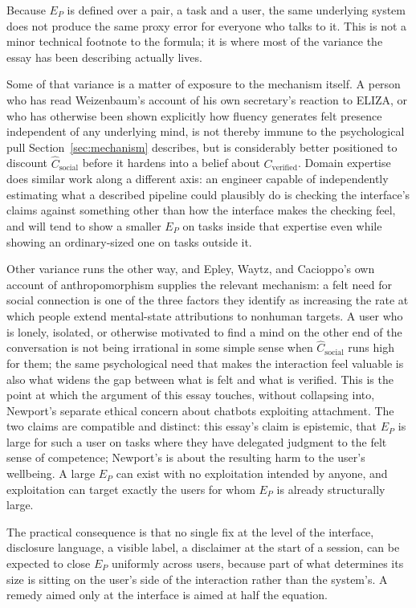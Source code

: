 \documentclass[11pt]{article}
\begin{document}
Because $E_P$ is defined over a pair, a task and a user, the same underlying system does not produce the same proxy error for everyone who talks to it. This is not a minor technical footnote to the formula; it is where most of the variance the essay has been describing actually lives.

Some of that variance is a matter of exposure to the mechanism itself. A person who has read Weizenbaum's account of his own secretary's reaction to ELIZA, or who has otherwise been shown explicitly how fluency generates felt presence independent of any underlying mind, is not thereby immune to the psychological pull Section~\ref{sec:mechanism} describes, but is considerably better positioned to discount $\widehat{C}_{\mathrm{social}}$ before it hardens into a belief about $C_{\mathrm{verified}}$. Domain expertise does similar work along a different axis: an engineer capable of independently estimating what a described pipeline could plausibly do is checking the interface's claims against something other than how the interface makes the checking feel, and will tend to show a smaller $E_P$ on tasks inside that expertise even while showing an ordinary-sized one on tasks outside it.

Other variance runs the other way, and Epley, Waytz, and Cacioppo's own account of anthropomorphism supplies the relevant mechanism\cite{epleywaytzcacioppo}: a felt need for social connection is one of the three factors they identify as increasing the rate at which people extend mental-state attributions to nonhuman targets. A user who is lonely, isolated, or otherwise motivated to find a mind on the other end of the conversation is not being irrational in some simple sense when $\widehat{C}_{\mathrm{social}}$ runs high for them; the same psychological need that makes the interaction feel valuable is also what widens the gap between what is felt and what is verified. This is the point at which the argument of this essay touches, without collapsing into, Newport's separate ethical concern about chatbots exploiting attachment. The two claims are compatible and distinct: this essay's claim is epistemic, that $E_P$ is large for such a user on tasks where they have delegated judgment to the felt sense of competence; Newport's is about the resulting harm to the user's wellbeing. A large $E_P$ can exist with no exploitation intended by anyone, and exploitation can target exactly the users for whom $E_P$ is already structurally large.

The practical consequence is that no single fix at the level of the interface, disclosure language, a visible label, a disclaimer at the start of a session, can be expected to close $E_P$ uniformly across users, because part of what determines its size is sitting on the user's side of the interaction rather than the system's. A remedy aimed only at the interface is aimed at half the equation.
\end{document}
